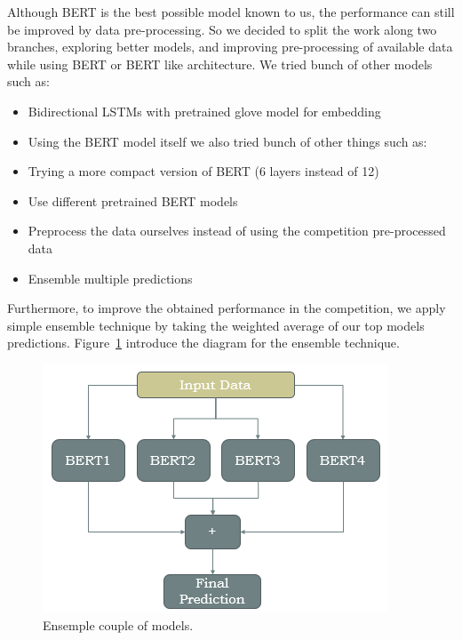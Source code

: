 \documentclass[10pt,twocolumn,letterpaper]{article}
\begin{document}
Although BERT is the best possible model known to us, the performance can still be improved by data pre-processing.
So we decided to split the work along two branches, exploring better models, and improving pre-processing of available data while using BERT or BERT like architecture.
We tried bunch of other models such as:
\begin{itemize}
\item Bidirectional LSTMs with pretrained glove model for embedding
\item Using the BERT model itself we also tried bunch of other things such as:
\item Trying a more compact version of BERT (6 layers instead of 12) 
\item Use different pretrained BERT models 
\item Preprocess the data ourselves instead of using the competition pre-processed data
\item Ensemble multiple predictions
\end{itemize}

Furthermore, to improve the obtained performance in the competition, we apply simple ensemble technique by taking the weighted average of our top models predictions. Figure~\ref{EnsempleCoupleOfModels} introduce the diagram for the ensemble technique.   

\begin{figure}[htbp]
\centerline{\includegraphics[width=0.999\columnwidth]{Figures/EnsempleCoupleOfModels.png}}
\caption{Ensemple couple of models.}
\label{EnsempleCoupleOfModels}
\end{figure}
\end{document}
